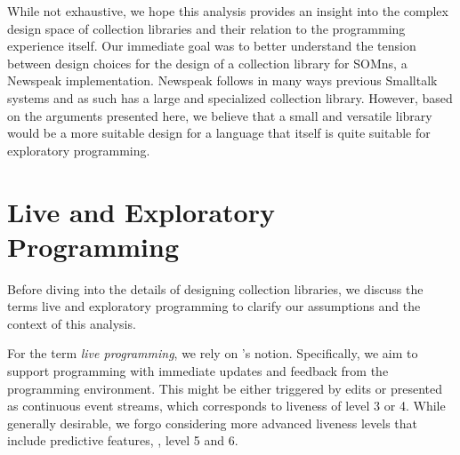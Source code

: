 \documentclass[sigconf, 10pt]{acmart}
\def\SOMns{SOM{\sc ns}\xspace}
\begin{document}
%
%
While not exhaustive, we hope this analysis provides an insight
into the complex design space of collection libraries
and their relation to the programming experience itself.
Our immediate goal was to better understand the tension between design choices
for the design of a collection library for \SOMns, a Newspeak implementation\citep{Bracha:10:NS,OptCELWithTruffle}.
Newspeak follows in many ways previous Smalltalk systems
and as such has a large and specialized collection library.
However, based on the arguments presented here,
we believe that a small and versatile library would be a more suitable design
for a language that itself is quite suitable for exploratory programming.


\section{Live and Exploratory Programming}
\label{sec:exploratory}

Before diving into the details of designing collection libraries,
we discuss the terms live and exploratory programming
to clarify our assumptions and the context of this analysis.


For the term \emph{live programming}, we rely on \citeauthor{Tanimoto:1990:Viva}'s notion.
Specifically, we aim to support programming
with immediate updates and feedback from the programming environment.
This might be either triggered by edits or presented as continuous event streams,
which corresponds to liveness of level 3 or 4\citep{Tanimoto:1990:Viva}.
While generally desirable, we forgo considering more advanced liveness levels
that include predictive features, \ie, level 5 and 6\citep{Tanimoto:2013:PEL}.
\end{document}
